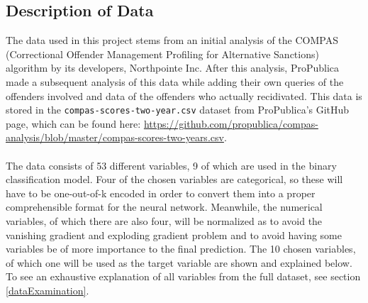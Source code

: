 \documentclass[11pt, fleqn, titlepage]{article}
\begin{document}
	\subsection{Description of Data} \label{dataDescription}
	The data used in this project stems from an initial analysis of the COMPAS (Correctional Offender Management Profiling for Alternative Sanctions) algorithm by its developers, Northpointe Inc. After this analysis, ProPublica made a subsequent analysis of this data while adding their own queries of the offenders involved and data of the offenders who actually recidivated. This data is stored in the \texttt{compas-scores-two-year.csv} dataset from ProPublica's GitHub page, which can be found here: \url{https://github.com/propublica/compas-analysis/blob/master/compas-scores-two-years.csv}. \\\\
	\noindent The data consists of 53 different variables, 9 of which are used in the binary classification model. Four of the chosen variables are categorical, so these will have to be one-out-of-k encoded in order to convert them into a proper comprehensible format for the neural network. Meanwhile, the numerical variables, of which there are also four, will be normalized as to avoid the vanishing gradient and exploding gradient problem and to avoid having some variables be of more importance to the final prediction.
	The 10 chosen variables, of which one will be used as the target variable are shown and explained below. To see an exhaustive explanation of all variables from the full dataset, see section \ref{dataExamination}.
	
\end{document}
